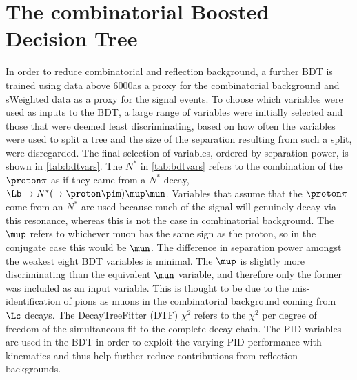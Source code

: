\section{The combinatorial Boosted Decision Tree}
\label{Sec:BDT}
In order to reduce combinatorial and reflection background, a further BDT is trained using \Lbpi data above 6000\mevcc as a proxy for the combinatorial background and sWeighted \LbKjpsi data as a proxy for the signal events.
To choose which variables were used as inputs to the BDT, a large range of variables were initially selected and those that were deemed least discriminating, based on how often the variables were used to split a tree and the size of the separation resulting from such a split, were disregarded. The final selection of variables, ordered by separation power, is shown in \autoref{tab:bdtvars}. The $N^{*}$ in \autoref{tab:bdtvars} refers to the combination of the $\proton\pi$ as if they came from a $N^{*}$ decay, $\Lb\to N^{*}(\to\proton\pim)\mup\mun$. Variables that assume that the $\proton\pi$  come from an $N^{*}$ are used because much of the signal will genuinely decay via this resonance, whereas this is not the case in combinatorial background. The $\mup$ \dllmupi refers to whichever muon has the same sign as the proton, so in the conjugate case this would be $\mun$. The difference in separation power amongst the weakest eight BDT variables is minimal. The $\mup$ \dllmupi is slightly more discriminating than the equivalent $\mun$ \dllmupi variable, and therefore only the former was included as an input variable. This is thought to be due to the mis-identification of pions as muons in the combinatorial background coming from $\Lc$ decays. The DecayTreeFitter (\gls{DTF}) $\chi^{2}$ refers to the $\chi^{2}$ per degree of freedom of the simultaneous fit to the complete decay chain. The PID variables are used in the BDT in order to exploit the varying PID performance with kinematics and thus help further reduce contributions from reflection backgrounds. %

